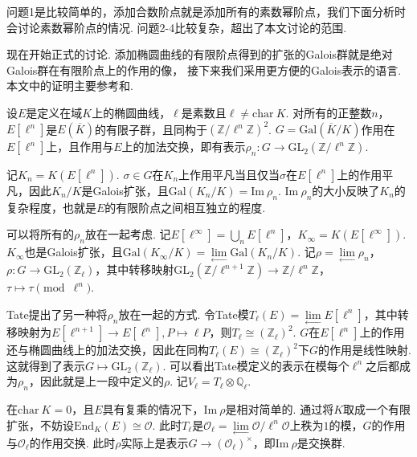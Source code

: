 问题1是比较简单的，添加合数阶点就是添加所有的素数幂阶点，我们下面分析时会讨论素数幂阶点的情况.
问题2-4比较复杂，超出了本文讨论的范围.

\vskip0.3cm

现在开始正式的讨论.
添加椭圆曲线的有限阶点得到的扩张的Galois群就是绝对Galois群在有限阶点上的作用的像，
接下来我们采用更方便的Galois表示的语言.
本文中的证明主要参考\parencite{serre1997abelian}和\parencite{serre1981quelques}.

设$E$是定义在域$K$上的椭圆曲线，$\ell$是素数且$\ell\neq \mathrm{char}\ K$. 对所有的正整数$n$，$E[\ell^n]$是$E(\overline{K})$的有限子群，且同构于$(\mathbb{Z}/\ell^n\mathbb{Z})^2$. $G = \mathrm{Gal}(\overline{K}/K)$作用在$E[\ell^n]$上，且作用与$E$上的加法交换，即有表示$\rho_n:G\to \mathrm{GL}_2(\mathbb{Z}/\ell^n \mathbb{Z})$.

记$K_n=K(E[\ell^n])$. $\sigma\in G$在$K_n$上作用平凡当且仅当$\sigma$在$E[\ell^n]$上的作用平凡，因此$K_n/K$是Galois扩张，且$\mathrm{Gal}(K_n/K)=\mathrm{Im}\ \rho_n$. $\mathrm{Im}\ \rho_n$的大小反映了$K_n$的复杂程度，也就是$E$的有限阶点之间相互独立的程度.

可以将所有的$\rho_n$放在一起考虑. 记$E[\ell^{\infty}]=\bigcup_n E[\ell^n]$，$K_{\infty} = K(E[\ell^{\infty}])$. $K_{\infty}$也是Galois扩张，且$\mathrm{Gal}(K_{\infty}/K) = \lim\limits_{\longleftarrow} \mathrm{Gal}(K_n/K)$. 记$\rho = \lim\limits_{\longleftarrow} \rho_n$，$\rho: G\to \mathrm{GL}_2(\mathbb{Z}_{\ell})$，其中转移映射$\mathrm{GL}_2(\mathbb{Z}/\ell^{n+1} \mathbb{Z}) \to \mathbb{Z}/\ell^n \mathbb{Z}$，$\tau \mapsto \tau \pmod{\ell^n}$.

Tate提出了另一种将$\rho_n$放在一起的方式. 令Tate模$T_{\ell}(E) = \lim\limits_{\longleftarrow} E[\ell^n]$，其中转移映射为$E[\ell^{n+1}]\to E[\ell^n], P\mapsto \ell P$，则$T_{\ell}\cong (\mathbb{Z}_{\ell})^2$. $G$在$E[\ell^n]$上的作用还与椭圆曲线上的加法交换，因此在同构$T_{\ell}(E)\cong (\mathbb{Z}_{\ell})^2$下$G$的作用是线性映射. 这就得到了表示$G\mapsto \mathrm{GL}_2(\mathbb{Z}_{\ell})$. 可以看出Tate模定义的表示在模每个$\ell^n$之后都成为$\rho_n$，因此就是上一段中定义的$\rho$.
记$V_{\ell} = T_{\ell}\otimes \mathbb{Q}_{\ell}$.

在$\mathrm{char}\ K = 0$，且$E$具有复乘的情况下，$\mathrm{Im}\ \rho$是相对简单的. 通过将$K$取成一个有限扩张，不妨设$\mathrm{End}_K(E) \cong \mathcal{O}$. 此时$T_{\ell}$是$\mathcal{O}_{\ell} = \lim\limits_{\longleftarrow}\mathcal{O}/\ell^n \mathcal{O}$上秩为$1$的模，$G$的作用与$\mathcal{O}_{\ell}$的作用交换. 此时$\rho$实际上是表示$G\to (\mathcal{O}_{\ell})^{\times}$，即$\mathrm{Im}\ \rho$是交换群.

